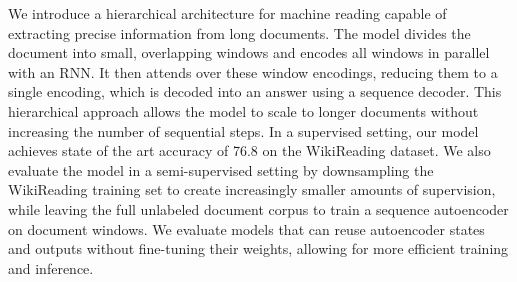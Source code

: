 We introduce a hierarchical architecture for machine reading capable of extracting precise information from long documents. The model divides the document into small, overlapping windows and encodes all windows in parallel with an RNN. It then attends over these window encodings, reducing them to a single encoding, which is decoded into an answer using a sequence decoder. This hierarchical approach allows the model to scale to longer documents without increasing the number of sequential steps. In a supervised setting, our model achieves state of the art accuracy of 76.8 on the WikiReading dataset. We also evaluate the model in a semi-supervised setting by downsampling the WikiReading training set to create increasingly smaller amounts of supervision, while leaving the full unlabeled document corpus to train a sequence autoencoder on document windows. We evaluate models that can reuse autoencoder states and outputs without fine-tuning their weights, allowing for more efficient training and inference.

